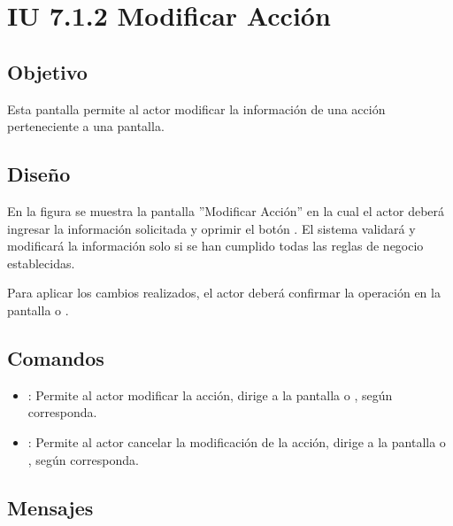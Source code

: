 \section{IU 7.1.2 Modificar Acción}

\subsection{Objetivo}
	Esta pantalla permite al actor modificar la información de una acción perteneciente a una pantalla.
\subsection{Diseño}
	En la figura  se muestra la pantalla ''Modificar Acción'' en la cual el actor deberá ingresar la información solicitada y oprimir el botón  . El sistema validará y modificará la información solo si se han cumplido todas las reglas de negocio establecidas.
	
	Para aplicar los cambios realizados, el actor deberá confirmar la operación en la pantalla  o .

\subsection{Comandos}
\begin{itemize}
	\item {}: Permite al actor modificar la acción, dirige a la pantalla  o , según corresponda.
	\item {}: Permite al actor cancelar la modificación de la acción, dirige a la pantalla  o , según corresponda.
\end{itemize}

\subsection{Mensajes}

